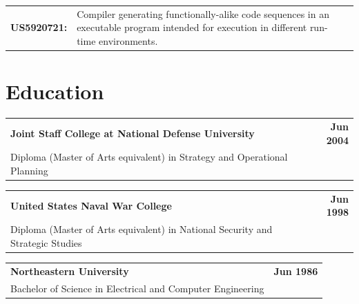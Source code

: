 \documentclass[letterpaper,10pt, sans]{article}
\makeatletter
\newcommand{\resumeEducationHeading}[3]{
  \item 
    \vspace{-1pt}
    \begin{tabular*}{1.0\textwidth}[t]{l@{\extracolsep{\fill}}r}
      \textbf{#1} & \textbf{#2} \\
      {#3}
    \end{tabular*}
    \vspace{-20pt}
  }
\newcommand{\resumeHeadingListStart}{\begin{description}[leftmargin=0cm]}
\newcommand{\resumeHeadingListEnd}{\end{description}}
\makeatother
\begin{document}
    \begin{tabular}{l p{475pt} l}
        \textbf{US5920721: } & Compiler generating functionally-alike code sequences in an executable program intended for execution in different run-time environments.
    \end{tabular}

\section{\textbf{Education}}
    \resumeHeadingListStart
        \resumeEducationHeading
        {Joint Staff College at National Defense University}
        {Jun 2004}
        {Diploma (Master of Arts equivalent) in Strategy and Operational Planning}
        \resumeEducationHeading
        {United States Naval War College}
        {Jun 1998}
        {Diploma (Master of Arts equivalent) in National Security and Strategic Studies}
        \resumeEducationHeading
        {Northeastern University}
        {Jun 1986}
        {Bachelor of Science in Electrical and Computer Engineering}
    \resumeHeadingListEnd



\end{document}

